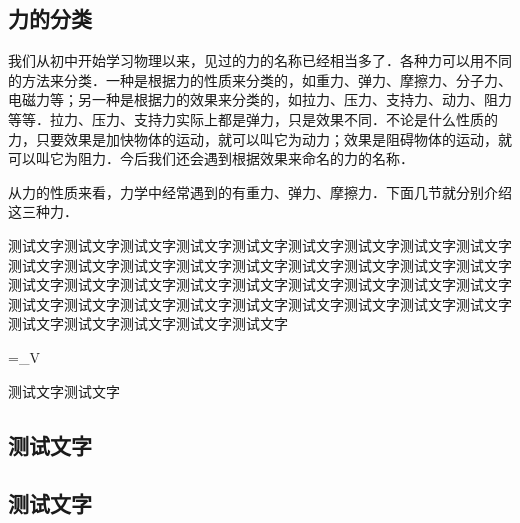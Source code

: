 \begin{Project}
\subsection{力的分类}

我们从初中开始学习物理以来，见过的力的名称已经相当多了．各种力可以用不同的方法来分类．一种是根据力的性质来分类的，如重力、弹力、摩擦力、分子力、电磁力等；另一种是根据力的效果来分类的，如拉力、压力、支持力、动力、阻力等等．拉力、压力、支持力实际上都是弹力，只是效果不同．不论是什么性质的力，只要效果是加快物体的运动，就可以叫它为动力；效果是阻碍物体的运动，就可以叫它为阻力．今后我们还会遇到根据效果来命名的力的名称．

从力的性质来看，力学中经常遇到的有重力、弹力、摩擦力．下面几节就分别介绍这三种力．


\begin{Example}
	测试文字测试文字测试文字测试文字测试文字测试文字测试文字测试文字测试文字测试文字测试文字测试文字测试文字测试文字测试文字测试文字测试文字测试文字测试文字测试文字测试文字测试文字测试文字测试文字测试文字测试文字测试文字测试文字测试文字测试文字测试文字测试文字测试文字测试文字测试文字测试文字测试文字测试文字测试文字测试文字测试文字
	\begin{flalign}
		\Psi=\int_\Omega{}V
	\end{flalign}
\end{Example}

\begin{Example}
	测试文字测试文字
\end{Example}


\subsection{测试文字}
\subsection*{测试文字}
\zhlipsum[1]




\makeatletter



\makeatother

\begin{multicols}{2}
\Basis

\Complex
\end{multicols}

\zhlipsum[1]


















\end{Project}
